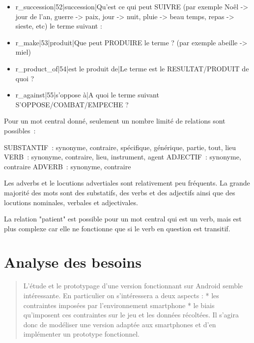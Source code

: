 \documentclass[a4paper,11pt,french]{article}
\begin{document}
\begin{itemize}
\item r\_succession|52|succession|Qu'est ce qui peut SUIVRE (par exemple Noêl -> jour de l'an, guerre -> paix, jour -> nuit,  pluie -> beau temps, repas -> sieste, etc) le terme suivant :

\item r\_make|53|produit|Que peut PRODUIRE le terme ? (par exemple abeille -> miel)

\item r\_product\_of|54|est le produit de|Le terme est le RESULTAT/PRODUIT de quoi ?

\item r\_against|55|s'oppose à|A quoi le terme suivant S'OPPOSE/COMBAT/EMPECHE ?

\end{itemize}


Pour un mot central donné, seulement un nombre limité de relations sont possibles~:

SUBSTANTIF~: synonyme, contraire, spécifique, générique, partie, tout, lieu
VERB~: synonyme, contraire, lieu, instrument, agent
ADJECTIF~: synonyme, contraire
ADVERB~: synonyme, contraire

Les adverbs et le locutions advertiales sont relativement peu fréquents. La grande majorité des mots sont des substatifs, des verbs et des adjectifs ainsi que des locutions nominales, verbales et adjectivales. 

La relation "patient" est possible pour un mot central qui est un verb, mais est plus complexe car elle ne fonctionne que si le verb en question est transitif. 


\section{Analyse des besoins}



\begin{quotation}
L'étude et le prototypage d'une version fonctionnant sur Android semble intéressante. En particulier on s'intéressera a deux aspects : * les contraintes imposées par l'environnement smartphone * le biais qu'imposent ces contraintes sur le jeu et les données récoltées. Il s'agira donc de modéliser une version adaptée aux smartphones et d'en implémenter un prototype fonctionnel. 
\end{quotation}
\end{document}

